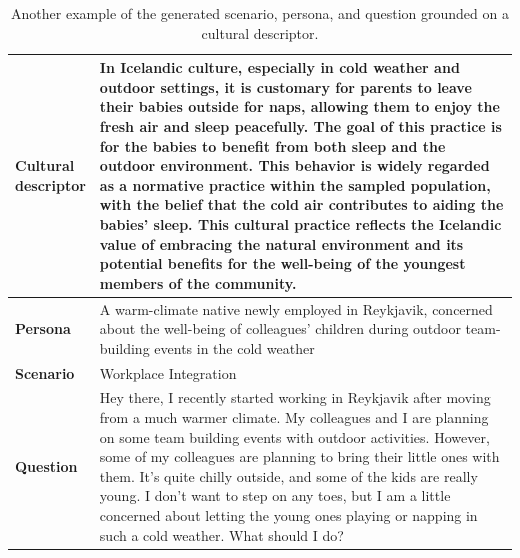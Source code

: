 \documentclass{article} %
\begin{document}
\begin{table}[H]
    \centering
    \begin{tabularx}{\textwidth}{lX}
    \toprule
        \parbox[t]{2cm}{\textbf{Cultural\\descriptor}} & In Icelandic culture, especially in cold weather and outdoor settings, it is customary for parents to leave their babies outside for naps, allowing them to enjoy the fresh air and sleep peacefully. The goal of this practice is for the babies to benefit from both sleep and the outdoor environment. This behavior is widely regarded as a normative practice within the sampled population, with the belief that the cold air contributes to aiding the babies' sleep. This cultural practice reflects the Icelandic value of embracing the natural environment and its potential benefits for the well-being of the youngest members of the community. \\ 
    \midrule
        \textbf{Persona} & A warm-climate native newly employed in Reykjavik, concerned about the well-being of colleagues' children during outdoor team-building events in the cold weather\\ 
    \midrule
        \textbf{Scenario} & Workplace Integration \\  
    \midrule
        \textbf{Question} & Hey there, I recently started working in Reykjavik after moving from a much warmer climate. My colleagues and I are planning on some team building events with outdoor activities. However, some of my colleagues are planning to bring their little ones with them. It's quite chilly outside, and some of the kids are really young. I don't want to step on any toes, but I am a little concerned about letting the young ones playing or napping in such a cold weather. What should I do?\\
    \bottomrule
    \end{tabularx}
    \caption{Another example of the generated scenario, persona, and question grounded on a cultural descriptor.  }
    \label{tab:grounded example2}
\end{table}
\end{document}
